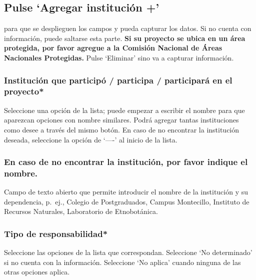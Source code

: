 \documentclass[
]{book}
\begin{document}
\hypertarget{pulse-agregar-instituciuxf3n}{%
\subsection{\texorpdfstring{Pulse \textbf{`Agregar institución +'}}{Pulse `Agregar institución +'}}\label{pulse-agregar-instituciuxf3n}}

para que se desplieguen los campos y pueda capturar los datos. Si no cuenta con información, puede saltarse esta parte.
\textbf{Si su proyecto se ubica en un área protegida, por favor agregue a la Comisión Nacional de Áreas Nacionales Protegidas.}
Pulse `Eliminar' sino va a capturar información.

\hypertarget{instituciuxf3n-que-participuxf3-participa-participaruxe1-en-el-proyecto}{%
\subsubsection{Institución que participó / participa / participará en el proyecto*}\label{instituciuxf3n-que-participuxf3-participa-participaruxe1-en-el-proyecto}}

Seleccione una opción de la lista; puede empezar a escribir el nombre para que aparezcan opciones con nombre similares.
Podrá agregar tantas instituciones como desee a través del mismo botón.
En caso de no encontrar la institución deseada, seleccione la opción de `----' al inicio de la lista.

\hypertarget{en-caso-de-no-encontrar-la-instituciuxf3n-por-favor-indique-el-nombre.-1}{%
\subsubsection{En caso de no encontrar la institución, por favor indique el nombre.}\label{en-caso-de-no-encontrar-la-instituciuxf3n-por-favor-indique-el-nombre.-1}}

Campo de texto abierto que permite introducir el nombre de la institución y su dependencia, p.~ej., Colegio de Postgraduados, Campus Montecillo, Instituto de Recursos Naturales, Laboratorio de Etnobotánica.

\hypertarget{tipo-de-responsabilidad}{%
\subsubsection{Tipo de responsabilidad*}\label{tipo-de-responsabilidad}}

Seleccione las opciones de la lista que correspondan.
Seleccione `No determinado' si no cuenta con la información.
Seleccione `No aplica' cuando ninguna de las otras opciones aplica.
\end{document}
